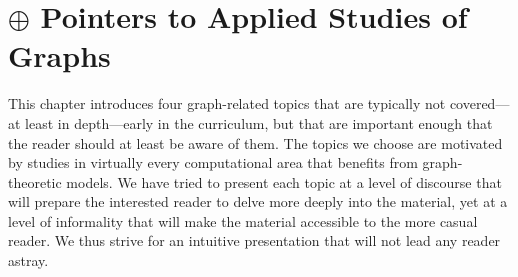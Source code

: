 
\chapter{$\oplus$ Pointers to Applied Studies of Graphs}
\label{ch:advanced-topics}

This chapter introduces four graph-related topics that are typically not covered---at least in depth---early in the curriculum, but that are important enough that the reader should at least be aware of them.  The topics we choose are motivated by studies in virtually every computational area that benefits from graph-theoretic models.  We have tried to present each topic at a level of discourse that will prepare the interested reader to delve more deeply into the material, yet at a level of informality that will make the material accessible to the more casual reader.  We thus strive for an intuitive presentation that will not lead any reader astray.

\smallskip

